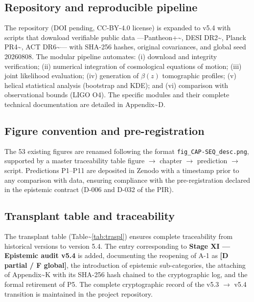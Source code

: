 ﻿\documentclass[11pt,letterpaper]{article}
\begin{document}
\subsection{Repository and reproducible pipeline}
The repository (DOI pending, CC-BY-4.0 license) is expanded to v5.4 with scripts that download verifiable public data ---Pantheon+\textasciitilde{}\cite{Brout2022}, DESI DR2\textasciitilde{}\cite{Lodha2025}, Planck PR4\textasciitilde{}\cite{Sullivan2025}, ACT DR6\textasciitilde{}\cite{DiegoPalazuelos2025}--- with SHA-256 hashes, original covariances, and global seed 20260808. The modular pipeline automates: (i) download and integrity verification; (ii) numerical integration of cosmological equations of motion; (iii) joint likelihood evaluation; (iv) generation of $\beta(z)$ tomographic profiles; (v) helical statistical analysis (bootstrap and KDE); and (vi) comparison with observational bounds (LIGO O4). The specific modules and their complete technical documentation are detailed in Appendix\textasciitilde{}D.
\subsection{Figure convention and pre-registration}
The 53 existing figures are renamed following the format \texttt{fig\_CAP-SEQ\_desc.png}, supported by a master traceability table figure $\to$ chapter $\to$ prediction $\to$ script. Predictions P1--P11 are deposited in Zenodo with a timestamp prior to any comparison with data, ensuring compliance with the pre-registration declared in the epistemic contract (D-006 and D-032 of the PIR).
\subsection{Transplant table and traceability}
The transplant table (Table\textasciitilde{}\ref{tab:traspl}) ensures complete traceability from historical versions to version 5.4. The entry corresponding to \textbf{Stage XI --- Epistemic audit v5.4} is added, documenting the reopening of A-1 as \textbf{[D partial / F global]}, the introduction of epistemic sub-categories, the attaching of Appendix\textasciitilde{}K with its SHA-256 hash chained to the cryptographic log, and the formal retirement of P5. The complete cryptographic record of the v5.3 $\to$ v5.4 transition is maintained in the project repository.
\end{document}
